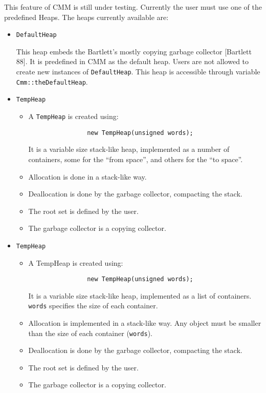 This feature of CMM is still under testing. Currently the user must
use one of the predefined Heaps. The heaps currently available
are:

\begin{itemize}
\item{{\tt DefaultHeap}}

This heap embeds the Bartlett's mostly copying garbage collector [Bartlett 88].
It is predefined in CMM as the default heap.
Users are not allowed to create new instances of {\tt DefaultHeap}.
This heap is accessible through variable {\tt Cmm::theDefaultHeap}.

\item{{\tt TempHeap}}
\begin{itemize}

\item A {\tt TempHeap} is created using:
\begin{verbatim}
                new TempHeap(unsigned words);
\end{verbatim}
It is a variable size stack-like heap, implemented as a number of
containers, some for the ``from space'', and others for the ``to space''.

\item Allocation is done in a stack-like way.

\item Deallocation is done by the garbage collector, compacting the stack.

\item The root set is defined by the user.

\item The garbage collector is a copying collector.
\end{itemize}

\item{{\tt TempHeap}}
\begin{itemize}

\item A TempHeap is created using:
\begin{verbatim}
                new TempHeap(unsigned words);
\end{verbatim}
It is a variable size stack-like heap, implemented as a list of
containers. {\tt words} specifies the size of each container.

\item Allocation is implemented in a stack-like way. Any object must be smaller
than the size of each container ({\tt words}).

\item Deallocation is done by the garbage collector, compacting the stack.

\item The root set is defined by the user.

\item The garbage collector is a copying collector.
\end{itemize}

\end{itemize}

